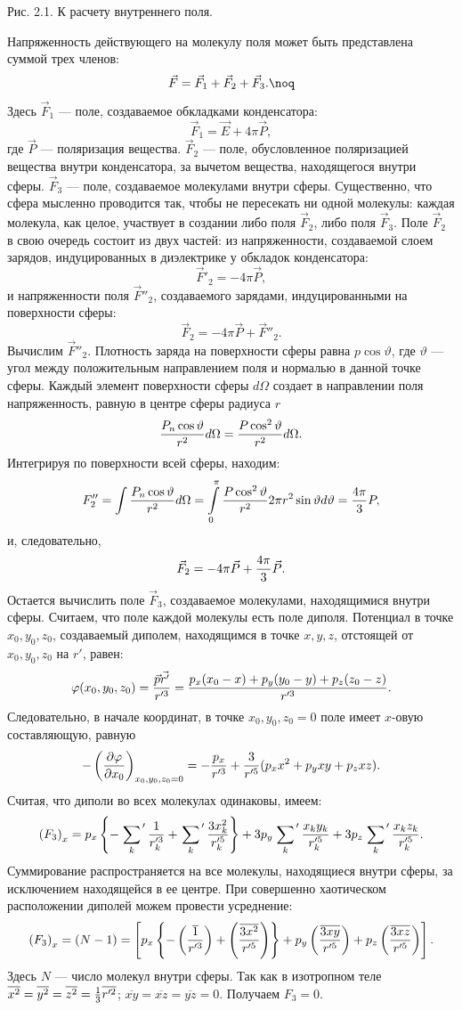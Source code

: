 \leftskip 0cm\centerline{\ris Рис. 2.1. К расчету внутреннего
поля.} \vskip 2mm Напряженность действующего на молекулу поля
может быть представлена суммой трех членов:
$$\vec F=\vec F_1+\vec F_2+\vec F_3.\noq$$
Здесь $\vec F_1$ --- поле, создаваемое обкладками конденсатора:
$$\vec F_1=\vec E+4\pi\vec P,$$
где $\vec P$ --- поляризация вещества. $\vec F_2$ --- поле,
обусловленное поляризацией вещества внутри конденсатора, за
вычетом вещества, находящегося внутри сферы. $\vec F_3$ --- поле,
создаваемое молекулами внутри сферы. Существенно, что сфера
мысленно проводится так, чтобы не пересекать ни одной молекулы:
каждая молекула, как целое, участвует в создании либо поля $\vec
F_2$, либо поля $\vec F_3$. Поле $\vec F_2$ в свою очередь состоит
из двух частей: из напряженности, создаваемой слоем зарядов,
индуцированных в диэлектрике у обкладок конденсатора:
$$\vec F'_{2}=-4\pi\vec P,$$
и напряженности поля $\vec F''_{2}$, создаваемого зарядами,
индуцированными на поверхности сферы:
$$\vec F_2=-4\pi\vec P+\vec F''_{2}.$$
Вычислим $\vec F''_{2}$. Плотность заряда на поверхности сферы
равна $p\cos\vartheta$, где $\vartheta$ --- угол между
положительным направлением поля и нормалью в данной точке сферы.
Каждый элемент поверхности сферы $d\Omega$ создает в направлении
поля напряженность, равную в центре сферы радиуса $r$
$${P_n\cos\vartheta\over r^2}d\Omega={P\cos^2\vartheta\over
r^2}d\Omega.$$ Интегрируя по поверхности всей сферы, находим:
$$F''_{2}=\int{P_n\cos\vartheta\over
r^2}d\Omega=\int\limits_0^{\pi}{P\cos^2\vartheta\over r^2}2\pi
r^2\sin\vartheta d\vartheta={4\pi\over3}P,$$ и, следовательно,
$$\vec F_2=-4\pi\vec P+{4\pi\over3}\vec P.$$
Остается вычислить поле $\vec F_3$, создаваемое молекулами,
находящимися внутри сферы. Считаем, что поле каждой молекулы есть
поле диполя. Потенциал в точке $x_0,y_0,z_0$, создаваемый диполем,
находящимся в точке $x,y,z$, отстоящей от $x_0,y_0,z_0$ на $r'$,
равен:
$$\varphi(x_0,y_0,z_0)={\vec p\vec {r'}\over
r'^3}={p_x(x_0-x)+p_y(y_0-y)+p_z(z_0-z)\over r'^3}.$$
Следовательно, в начале координат, в точке $x_0,y_0,z_0=0$ поле
имеет $x$-овую составляющую, равную
$$-\left(\partial\varphi\over\partial
x_0\right)_{x_0,y_0,z_0=0}=-{p_x\over r'^3}+{3\over r'^5}(p_xx^2+
p_yxy+p_zxz).$$ Считая, что диполи во всех молекулах одинаковы,
имеем:
$$\left(F_3\right)_x=p_x\left\{-\left.\sum_k\right.'{1\over
r'^3_k}+\left.\sum_k\right.'{3x_k^2\over
r'^5_k}\right\}+3p_y\left.\sum_k\right.'{x_ky_k\over
r'^5_k}+3p_z\left.\sum_k\right.'{x_kz_k\over r'^5_k}.$$
Суммирование распространяется на все молекулы, находящиеся внутри
сферы, за исключением находящейся в ее центре. При совершенно
хаотическом расположении диполей можем провести усреднение:
$$\left(F_3\right)_x=(N-1)=\left[p_x\left\{-\left({\overline{1}\over
r'^3}\right)+\left({\overline{3x^2}\over r'^5}\right)\right\}+p_y
\left({\overline{3xy}\over r'^5}\right)+p_z\left(
{\overline{3xz}\over r'^5}\right)\right].$$ Здесь $N$ --- число
молекул внутри сферы. Так как в изотропном теле
$\overline{x^2}=\overline{y^2}=\overline{z^2}={1\over3}\overline{r'^2}$;
$\overline{xy}=\overline{xz}=\overline{yz}=0$. Получаем $F_3=0$.

